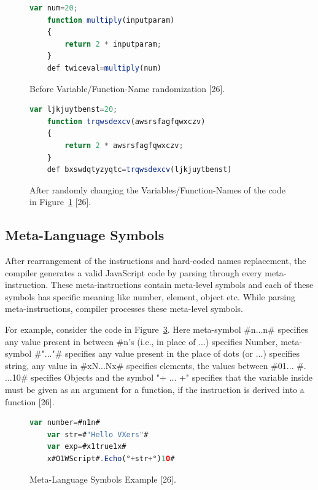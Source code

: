 \begin{figure}
  \centering
  \begin{lstlisting}[language=JavaScript]
	var num=20;
	function multiply(inputparam) 
	{ 
		return 2 * inputparam; 
	}
	def twiceval=multiply(num)
\end{lstlisting}
    \caption[Before Variable/Function-Name randomization]{Before Variable/Function-Name randomization [26].}
    \label{fig:randomization}
\end{figure}

\begin{figure}
  \centering
  \begin{lstlisting}[language=JavaScript]
	var ljkjuytbenst=20;
	function trqwsdexcv(awsrsfagfqwxczv) 
	{ 
		return 2 * awsrsfagfqwxczv; 
	}
	def bxswdqtyzyqtc=trqwsdexcv(ljkjuytbenst)
\end{lstlisting}
    \caption[After Variable/Function-Name randomization]{After randomly changing the Variables/Function-Names of the code in Figure~\ref{fig:randomization} [26].}
    \label{fig:afterrandomization}
\end{figure}

\subsection{Meta-Language Symbols}

After rearrangement of the instructions and hard-coded names replacement, the compiler generates a valid JavaScript code by parsing through every meta-instruction. These meta-instructions contain meta-level symbols and each of these symbols has specific meaning like number, element, object etc. While parsing meta-instructions, compiler processes these meta-level symbols.

For example, consider the code in Figure~\ref{fig:metalanguage}. Here meta-symbol \#n...n\# specifies any value present in between \#n's (i.e., in place of ...) specifies Number, meta-symbol \#"..."\# specifies any value present in the place of dots (or ...) specifies string, any value in \#xN...Nx\# specifies elements, the values between \#01... \#. ...10\# specifies Objects and the symbol "\textdegree+ ... +\textdegree" specifies that the variable inside must be given as an argument for a function, if the instruction is derived into a function [26].

\begin{figure}
  \centering
  \begin{lstlisting}[language=JavaScript]
	var number=#n1n#					
	var str=#"Hello VXers"#				
	var exp=#x1true1x#					
	x#O1WScript#.Echo(°+str+°)1O#
\end{lstlisting}
    \caption[Meta-Language Symbols Example]{Meta-Language Symbols Example [26].}
    \label{fig:metalanguage}
\end{figure}

